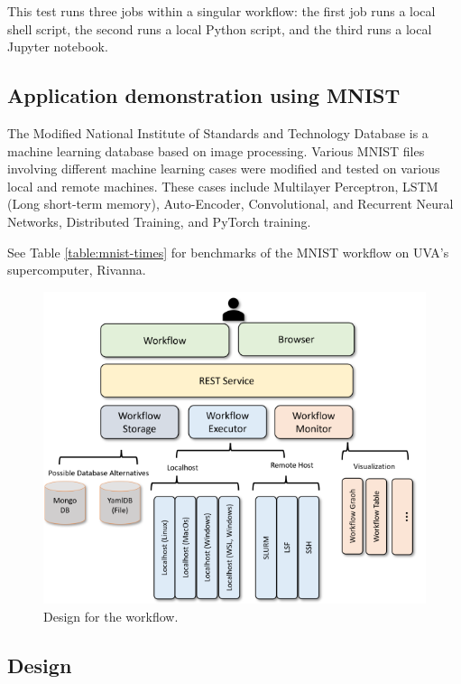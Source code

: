 This test runs three jobs within a singular workflow: the first job runs
a local shell script, the second runs a local Python script, and the
third runs a local Jupyter notebook.

\subsection{Application demonstration using
MNIST}\label{application-demonstration-using-mnist}

The Modified National Institute of Standards and Technology Database is
a machine learning database based on image processing. Various MNIST
files involving different machine learning cases were modified and
tested on various local and remote machines. These cases include
Multilayer Perceptron, LSTM (Long short-term memory), Auto-Encoder,
Convolutional, and Recurrent Neural Networks, Distributed Training, and
PyTorch training.

See Table \ref{table:mnist-times} for benchmarks of the MNIST workflow
on UVA's supercomputer, Rivanna.

\begin{figure}
\centering
\includegraphics[width=1.0\columnwidth]{images/workflow-uml.png}
\caption{Design for the workflow.}\label{fig:workflow-uml}
\end{figure}

\subsection{Design}\label{design}


